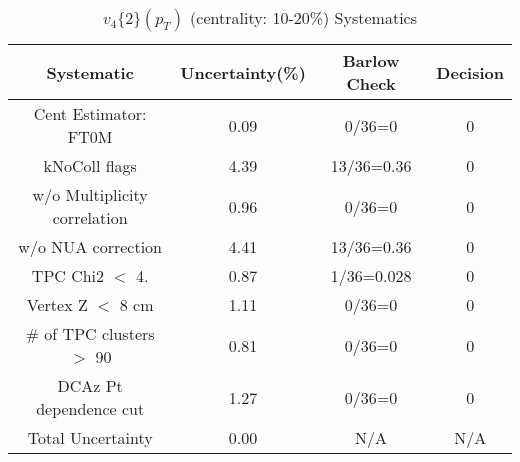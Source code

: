 \begin{table}[htbp]
\caption{$v_4\{2\}(p_{T})$ (centrality: 10-20\%) Systematics}
\label{tab:Sys_pTDiffv4}
\centering
\begin{tabular}{|c|c|c|c|}
\hline
Systematic & Uncertainty(\%) & Barlow Check & Decision \\
\hline
Cent Estimator: FT0M & 0.09 & 0/36=0 & 0 \\
kNoColl flags & 4.39 & 13/36=0.36 & 0 \\
w/o Multiplicity correlation & 0.96 & 0/36=0 & 0 \\
w/o NUA correction & 4.41 & 13/36=0.36 & 0 \\
TPC Chi2 $<$ 4. & 0.87 & 1/36=0.028 & 0 \\
Vertex Z $<$ 8 cm & 1.11 & 0/36=0 & 0 \\
\# of TPC clusters $>$ 90 & 0.81 & 0/36=0 & 0 \\
DCAz Pt dependence cut & 1.27 & 0/36=0 & 0 \\
\hline
Total Uncertainty & 0.00 & N/A & N/A \\
\hline
\end{tabular}
\end{table}
